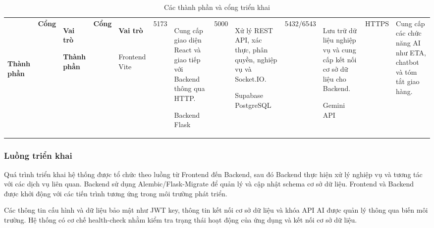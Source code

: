 \begin{longtable}{|p{3.2cm}|p{2.3cm}|p{8cm}|}

\caption{Các thành phần và cổng triển khai} \

\label{tab:deployment-components} \

\hline

\textbf{Thành phần} & \textbf{Cổng} & \textbf{Vai trò} \

\hline

\endfirsthead

\hline

\textbf{Thành phần} & \textbf{Cổng} & \textbf{Vai trò} \

\hline

\endhead

Frontend Vite & 5173 & Cung cấp giao diện React và giao tiếp với Backend thông qua HTTP. \

\hline

Backend Flask & 5000 & Xử lý REST API, xác thực, phân quyền, nghiệp vụ và Socket.IO. \

\hline

Supabase PostgreSQL & 5432/6543 & Lưu trữ dữ liệu nghiệp vụ và cung cấp kết nối cơ sở dữ liệu cho Backend. \

\hline

Gemini API & HTTPS & Cung cấp các chức năng AI như ETA, chatbot và tóm tắt giao hàng. \

\hline

\end{longtable}

\subsubsection{Luồng triển khai}

Quá trình triển khai hệ thống được tổ chức theo luồng từ Frontend đến Backend, sau đó Backend thực hiện xử lý nghiệp vụ và tương tác với các dịch vụ liên quan. Backend sử dụng Alembic/Flask-Migrate để quản lý và cập nhật schema cơ sở dữ liệu. Frontend và Backend được khởi động với các tiến trình tương ứng trong môi trường phát triển.

Các thông tin cấu hình và dữ liệu bảo mật như JWT key, thông tin kết nối cơ sở dữ liệu và khóa API AI được quản lý thông qua biến môi trường. Hệ thống có cơ chế health-check nhằm kiểm tra trạng thái hoạt động của ứng dụng và kết nối cơ sở dữ liệu.
